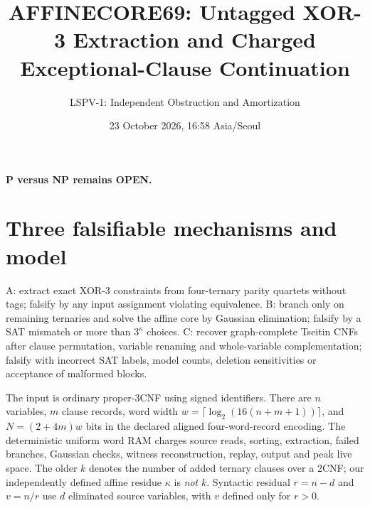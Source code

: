 \documentclass[11pt]{article}
\title{AFFINECORE69: Untagged XOR-3 Extraction and Charged Exceptional-Clause Continuation}
\author{LSPV-1: Independent Obstruction and Amortization}
\date{23 October 2026, 16:58 Asia/Seoul}
\begin{document}
\maketitle
\begin{center}\textbf{P versus NP remains OPEN.}\end{center}
\section{Three falsifiable mechanisms and model}
\noindent A: extract exact XOR-3 constraints from four-ternary parity quartets without tags; falsify by any input assignment violating equivalence. B: branch only on remaining ternaries and solve the affine core by Gaussian elimination; falsify by a SAT mismatch or more than $3^\kappa$ choices. C: recover graph-complete Tseitin CNFs after clause permutation, variable renaming and whole-variable complementation; falsify with incorrect SAT labels, model counts, deletion sensitivities or acceptance of malformed blocks.

The input is ordinary proper-3CNF using signed identifiers. There are $n$ variables, $m$ clause records, word width $w=\lceil\log_2(16(n+m+1))\rceil$, and $N=(2+4m)w$ bits in the declared aligned four-word-record encoding. The deterministic uniform word RAM charges source reads, sorting, extraction, failed branches, Gaussian checks, witness reconstruction, replay, output and peak live space. The older $k$ denotes the number of added ternary clauses over a 2CNF; our independently defined affine residue $\kappa$ is \emph{not} $k$. Syntactic residual $r=n-d$ and $v=n/r$ use $d$ eliminated source variables, with $v$ defined only for $r>0$.
\end{document}
